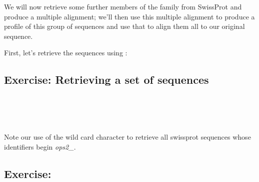 \documentclass[12pt]{report}
\begin{document}
We will now retrieve some further members of the family from SwissProt
and produce a multiple alignment; we'll then use this multiple
alignment to produce a profile of this group of sequences and use that
to align them all to our original sequence.

First, let's retrieve the sequences using :

\subsection*{Exercise: Retrieving a set of sequences}

\unix{}\\
\\
\\

Note our use of the wild card character {\bf *} to retrieve all
swissprot sequences whose identifiers begin {\em ops2\_}.

\subsection*{Exercise: }
\end{document}
